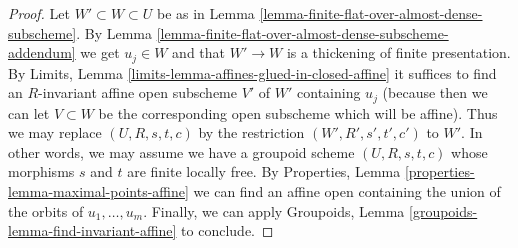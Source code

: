 \documentclass{stacks-project}
\theoremstyle{plain}
\theoremstyle{definition}
\theoremstyle{remark}
\numberwithin{equation}{subsection}
\begin{document}
\begin{proof}
Let $W' \subset W \subset U$ be as in
Lemma \ref{lemma-finite-flat-over-almost-dense-subscheme}.
By Lemma \ref{lemma-finite-flat-over-almost-dense-subscheme-addendum}
we get $u_j \in W$ and that $W' \to W$ is a thickening of finite presentation.
By Limits, Lemma \ref{limits-lemma-affines-glued-in-closed-affine}
it suffices to find an $R$-invariant affine open subscheme
$V'$ of $W'$ containing $u_j$ (because then we can let $V \subset W$
be the corresponding open subscheme which will be affine).
Thus we may replace $(U, R, s, t, c)$ by the restriction
$(W', R', s', t', c')$ to $W'$.
In other words, we may assume we have a groupoid scheme $(U, R, s, t, c)$
whose morphisms $s$ and $t$ are finite locally free.
By Properties, Lemma \ref{properties-lemma-maximal-points-affine}
we can find an affine open containing the union of the orbits of
$u_1, \ldots, u_m$. Finally, we can apply
Groupoids, Lemma \ref{groupoids-lemma-find-invariant-affine}
to conclude.
\end{proof}
\end{document}
